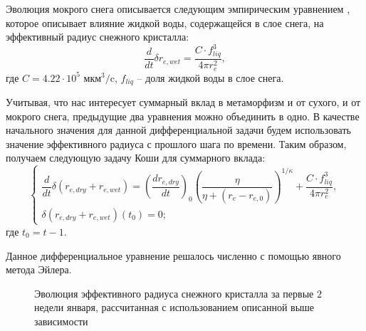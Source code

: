 \documentclass[a4paper, fontsize=14pt]{scrartcl}
\begin{document}
Эволюция мокрого снега описывается следующим эмпирическим уравнением \cite{CLM4.5tech, Brun1989}, которое описывает влияние жидкой воды, содержащейся в слое снега, на эффективный радиус снежного кристалла:
\begin{equation}
\dfrac{d}{dt} \delta r_{e , wet} = \dfrac{C \cdot f_{liq}^3} {4 \pi r_{e}^2}, \label{sys}
\end{equation}
где $C = 4.22 \cdot 10^{5}$ мкм$^3/$c, $f_{liq}$ -- доля жидкой воды в слое снега.

Учитывая, что нас интересует суммарный вклад в метаморфизм и от сухого, и от мокрого снега, предыдущие два уравнения можно объединить в одно. В качестве начального значения для данной дифференциальной задачи будем использовать значение эффективного радиуса с прошлого шага по времени. Таким образом, получаем следующую задачу Коши для суммарного вклада:
\begin{equation}
    \begin{cases}
        \dfrac{d}{dt} \delta (r_{e , dry} + r_{e , wet}) = {\left( \dfrac{dr_{e , dry}}{dt} \right)}_0 \left(\dfrac{\eta}{\eta + (r_e - r_{e, 0})}\right)^{1 / \kappa} + \dfrac{C \cdot f_{liq}^3} {4 \pi r_{e}^2} ,
        \\
        \delta (r_{e , dry} + r_{e , wet})(t_0) = 0; 
    \end{cases} \label{sysRDS2}
\end{equation}
где $t_0 = t - 1$. 

Данное дифференциальное уравнение решалось численно с помощью явного метода Эйлера.

\begin{figure}[H]
    \caption{Эволюция эффективного радиуса снежного кристалла за первые $2$ недели января, рассчитанная с использованием описанной выше зависимости}
    \label{fig:image}
\end{figure}
 
\end{document}
